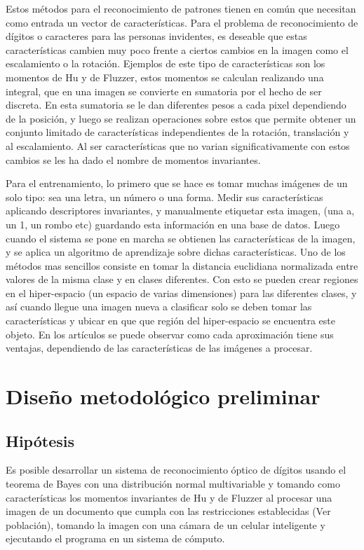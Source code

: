 \documentclass[a4paper, 11pt, oneside]{article}
\begin{document}
	
	Estos métodos para el reconocimiento de patrones tienen en común que necesitan como
	entrada un vector de características. Para el problema de reconocimiento de dígitos
	o caracteres para las personas invidentes, es deseable que estas características cambien
	muy poco frente a ciertos cambios en la imagen como el escalamiento o la rotación.
	Ejemplos de este tipo de características son los momentos de Hu y de Fluzzer, estos
	momentos se calculan realizando una integral, que en una imagen se convierte en sumatoria
	por el hecho de ser discreta. En esta sumatoria se le dan diferentes pesos a cada pixel
	dependiendo de la posición, y luego se realizan operaciones sobre estos que permite
	obtener un conjunto limitado de características independientes de la rotación, translación
	y al escalamiento. Al ser características que no varian significativamente con estos 
	cambios se les ha dado el nombre de momentos invariantes.
	
	Para el entrenamiento, lo primero que se hace es tomar muchas imágenes de un solo tipo: sea una letra, un 
	número o una forma. Medir sus características aplicando descriptores invariantes, y manualmente 
    etiquetar esta imagen, (una a, un 1, un rombo etc) guardando esta información en una base de
    datos. Luego cuando el sistema se pone en marcha se obtienen las características de la imagen,
    y se aplica un algoritmo de aprendizaje sobre dichas características. Uno de los métodos mas
	sencillos consiste en tomar la distancia euclidiana normalizada entre valores de la misma
	clase y en clases diferentes. Con esto se pueden crear regiones en el hiper-espacio (un
	espacio de varias dimensiones) para las diferentes clases, y así cuando llegue una imagen
	nueva a clasificar solo se deben tomar las características y ubicar en que que región del
	hiper-espacio se encuentra este objeto. En los artículos se puede observar como  
	cada aproximación tiene sus ventajas, dependiendo de las características de las imágenes a
	procesar.
	\newpage
		
	\section{Diseño metodológico preliminar}
	
	\subsection{Hipótesis}
	Es posible desarrollar un sistema de reconocimiento óptico de dígitos usando el teorema
	de Bayes con una distribución normal multivariable y tomando como características los
	momentos invariantes de Hu y de Fluzzer al procesar una imagen de un documento que 
	cumpla con las restricciones establecidas (Ver población), tomando la imagen con
	una cámara de un celular inteligente y ejecutando el programa en un sistema de cómputo.
		
\end{document}
